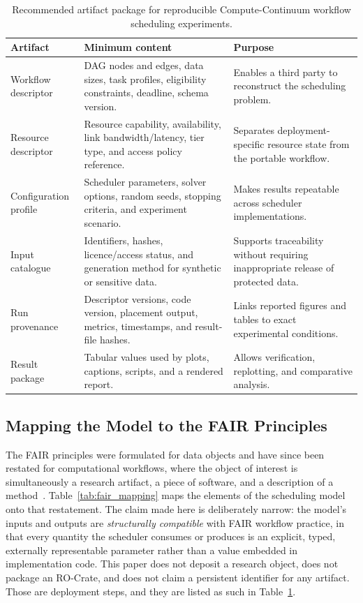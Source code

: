 \begin{table}[t]
\centering
\caption{Recommended artifact package for reproducible Compute-Continuum workflow scheduling experiments.}
\label{tab:artifact_checklist}
\small
\begin{tabular}{p{}p{}p{}}
\toprule
\textbf{Artifact} & \textbf{Minimum content} & \textbf{Purpose} \\
\midrule
Workflow descriptor & DAG nodes and edges, data sizes, task profiles, eligibility constraints, deadline, schema version. & Enables a third party to reconstruct the scheduling problem. \\
\addlinespace
Resource descriptor & Resource capability, availability, link bandwidth/latency, tier type, and access policy reference. & Separates deployment-specific resource state from the portable workflow. \\
\addlinespace
Configuration profile & Scheduler parameters, solver options, random seeds, stopping criteria, and experiment scenario. & Makes results repeatable across scheduler implementations. \\
\addlinespace
Input catalogue & Identifiers, hashes, licence/access status, and generation method for synthetic or sensitive data. & Supports traceability without requiring inappropriate release of protected data. \\
\addlinespace
Run provenance & Descriptor versions, code version, placement output, metrics, timestamps, and result-file hashes. & Links reported figures and tables to exact experimental conditions. \\
\addlinespace
Result package & Tabular values used by plots, captions, scripts, and a rendered report. & Allows verification, replotting, and comparative analysis. \\
\bottomrule
\end{tabular}
\end{table}

\subsection{Mapping the Model to the FAIR Principles}
\label{subsec:fair_mapping}

The FAIR principles were formulated for data objects and have since been restated for computational
workflows, where the object of interest is simultaneously a research artifact, a piece of software,
and a description of a method~\cite{wilkinson2016fair,swilkinson2025fairworkflows}.
Table~\ref{tab:fair_mapping} maps the elements of the scheduling model onto that restatement. The
claim made here is deliberately narrow: the model's inputs and outputs are \emph{structurally
compatible} with FAIR workflow practice, in that every quantity the scheduler consumes or produces
is an explicit, typed, externally representable parameter rather than a value embedded in
implementation code. This paper does not deposit a research object, does not package an RO-Crate,
and does not claim a persistent identifier for any artifact. Those are deployment steps, and they
are listed as such in Table~\ref{tab:artifact_checklist}.

